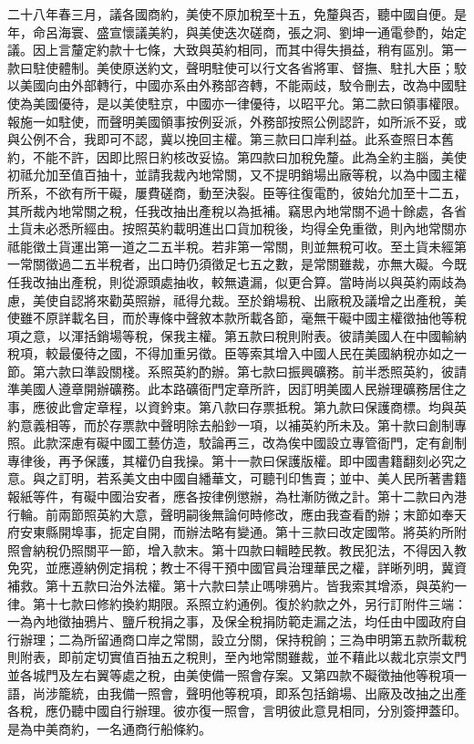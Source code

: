 \begin{pinyinscope}
二十八年春三月，議各國商約，美使不原加稅至十五，免釐與否，聽中國自便。是年，命呂海寰、盛宣懷議美約，與美使迭次磋商，張之洞、劉坤一通電參酌，始定議。因上言釐定約款十七條，大致與英約相同，而其中得失損益，稍有區別。第一款曰駐使體制。美使原送約文，聲明駐使可以行文各省將軍、督撫、駐扎大臣；駮以美國向由外部轉行，中國亦系由外務部咨轉，不能兩歧，駮令刪去，改為中國駐使為美國優待，是以美使駐京，中國亦一律優待，以昭平允。第二款曰領事權限。報施一如駐使，而聲明美國領事按例妥派，外務部按照公例認許，如所派不妥，或與公例不合，我即可不認，冀以挽回主權。第三款曰口岸利益。此系查照日本舊約，不能不許，因即比照日約核改妥協。第四款曰加稅免釐。此為全約主腦，美使初祗允加至值百抽十，並請我裁內地常關，又不提明銷場出廠等稅，以為中國主權所系，不欲有所干礙，屢費磋商，動至決裂。臣等往復電酌，彼始允加至十二五，其所裁內地常關之稅，任我改抽出產稅以為抵補。竊思內地常關不過十餘處，各省土貨未必悉所經由。按照英約載明進出口貨加稅後，均得全免重徵，則內地常關亦祗能徵土貨運出第一道之二五半稅。若非第一常關，則並無稅可收。至土貨未經第一常關徵過二五半稅者，出口時仍須徵足七五之數，是常關雖裁，亦無大礙。今既任我改抽出產稅，則從源頭處抽收，較無遺漏，似更合算。當時尚以與英約兩歧為慮，美使自認將來勸英照辦，祗得允裁。至於銷場稅、出廠稅及議增之出產稅，美使雖不原詳載名目，而於專條中聲敘本款所載各節，毫無干礙中國主權徵抽他等稅項之意，以渾括銷場等稅，保我主權。第五款曰稅則附表。彼請美國人在中國輸納稅項，較最優待之國，不得加重另徵。臣等索其增入中國人民在美國納稅亦如之一節。第六款曰準設關棧。系照英約酌辦。第七款曰振興礦務。前半悉照英約，彼請準美國人遵章開辦礦務。此本路礦衙門定章所許，因訂明美國人民辦理礦務居住之事，應彼此會定章程，以資鈐束。第八款曰存票抵稅。第九款曰保護商標。均與英約意義相等，而於存票款中聲明除去船鈔一項，以補英約所未及。第十款曰創制專照。此款深慮有礙中國工藝仿造，駮論再三，改為俟中國設立專管衙門，定有創制專律後，再予保護，其權仍自我操。第十一款曰保護版權。即中國書籍翻刻必究之意。與之訂明，若系美文由中國自繙華文，可聽刊印售賣；並中、美人民所著書籍報紙等件，有礙中國治安者，應各按律例懲辦，為杜漸防微之計。第十二款曰內港行輪。前兩節照英約大意，聲明嗣後無論何時修改，應由我查看酌辦；末節如奉天府安東縣開埠事，扼定自開，而辦法略有變通。第十三款曰改定國幣。將英約所附照會納稅仍照關平一節，增入款末。第十四款曰輯睦民教。教民犯法，不得因入教免究，並應遵納例定捐稅；教士不得干預中國官員治理華民之權，詳晰列明，冀資補救。第十五款曰治外法權。第十六款曰禁止嗎啡鴉片。皆我索其增添，與英約一律。第十七款曰修約換約期限。系照立約通例。復於約款之外，另行訂附件三端：一為內地徵抽鴉片、鹽斤稅捐之事，及保全稅捐防範走漏之法，均任由中國政府自行辦理；二為所留通商口岸之常關，設立分關，保持稅餉；三為申明第五款所載稅則附表，即前定切實值百抽五之稅則，至內地常關雖裁，並不藉此以裁北京崇文門並各城門及左右翼等處之稅，由美使備一照會存案。又第四款不礙徵抽他等稅項一語，尚涉籠統，由我備一照會，聲明他等稅項，即系包括銷場、出廠及改抽之出產各稅，應仍聽中國自行辦理。彼亦復一照會，言明彼此意見相同，分別簽押蓋印。是為中美商約，一名通商行船條約。


\end{pinyinscope}

